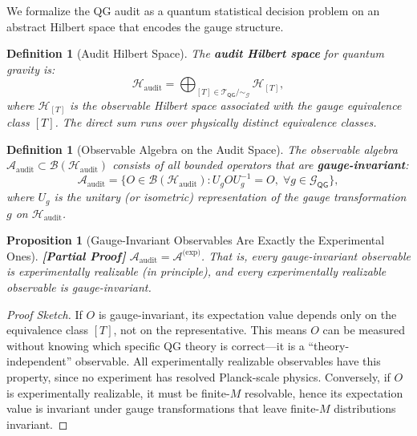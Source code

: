 \documentclass[12pt,a4paper]{article}
\newtheorem{proposition}[theorem]{Proposition}
\newtheorem{definition}[theorem]{Definition}
\theoremstyle{remark}
\newcommand{\G}{\mathcal{G}}
\newcommand{\T}{\mathcal{T}}
\newcommand{\A}{\mathcal{A}}
\newcommand{\B}{\mathcal{B}}
\newcommand{\Hilb}{\mathcal{H}}
\newcommand{\QG}{\textsf{QG}}
\newcommand{\rigorPartial}{\textbf{[Partial Proof]}}
\begin{document}
We formalize the QG audit as a quantum statistical decision problem on an abstract Hilbert space that encodes the gauge structure.

\begin{definition}[Audit Hilbert Space]
\label{def:audit_hilbert}
The \textbf{audit Hilbert space} for quantum gravity is:
\begin{equation}
  \Hilb_{\text{audit}} = \bigoplus_{[T] \in \T_{\QG}/\sim_{\G}} \Hilb_{[T]},
\end{equation}
where $\Hilb_{[T]}$ is the observable Hilbert space associated with the gauge equivalence class $[T]$. The direct sum runs over physically distinct equivalence classes.
\end{definition}

\begin{definition}[Observable Algebra on the Audit Space]
\label{def:obs_algebra}
The observable algebra $\A_{\text{audit}} \subset \B(\Hilb_{\text{audit}})$ consists of all bounded operators that are \textbf{gauge-invariant}:
\begin{equation}
  \A_{\text{audit}} = \{O \in \B(\Hilb_{\text{audit}}) : U_g O U_g^{-1} = O,\; \forall g \in \G_{\QG}\},
\end{equation}
where $U_g$ is the unitary (or isometric) representation of the gauge transformation $g$ on $\Hilb_{\text{audit}}$.
\end{definition}

\begin{proposition}[Gauge-Invariant Observables Are Exactly the Experimental Ones]
\label{prop:gauge_inv_experimental}
\rigorPartial
$\A_{\text{audit}} = \A^{\text{(exp)}}$. That is, every gauge-invariant observable is experimentally realizable (in principle), and every experimentally realizable observable is gauge-invariant.
\end{proposition}

\begin{proof}[Proof Sketch]
If $O$ is gauge-invariant, its expectation value depends only on the equivalence class $[T]$, not on the representative. This means $O$ can be measured without knowing which specific QG theory is correct---it is a ``theory-independent'' observable. All experimentally realizable observables have this property, since no experiment has resolved Planck-scale physics. Conversely, if $O$ is experimentally realizable, it must be finite-$M$ resolvable, hence its expectation value is invariant under gauge transformations that leave finite-$M$ distributions invariant.
\end{proof}
\end{document}
